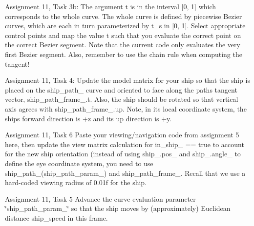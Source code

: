 \begin{DoxyRefList}
\item[\label{todo__todo000005}%
\hypertarget{todo__todo000005}{}%
Member \hyperlink{classPiecewiseBezier_a46e8a8d04d7fdd22b662204419c21273}{Piecewise\+Bezier\+:\+:tangent} (float t) const ]Assignment 11, Task 3b\+: The argument t is in the interval \mbox{[}0, 1\mbox{]} which corresponds to the whole curve. The whole curve is defined by piecewise Bezier curves, which are each in turn parameterized by t\+\_\+s in \mbox{[}0, 1\mbox{]}. Select appropriate control points and map the value t such that you evaluate the correct point on the correct Bezier segment. Note that the current code only evaluates the very first Bezier segment. Also, remember to use the chain rule when computing the tangent!  
\item[\label{todo__todo000008}%
\hypertarget{todo__todo000008}{}%
Member \hyperlink{classSolar__viewer_af6b468fb543b9c9ed466fe1687f1aff8}{Solar\+\_\+viewer\+:\+:draw\+\_\+scene} (\hyperlink{classmat4}{mat4} \&\+\_\+projection, \hyperlink{classmat4}{mat4} \&\+\_\+view)]Assignment 11, Task 4\+: Update the model matrix for your ship so that the ship is placed on the {\ttfamily ship\+\_\+path\+\_\+} curve and oriented to face along the path\textquotesingle{}s tangent vector, {\ttfamily ship\+\_\+path\+\_\+frame\+\_\+.\+t}. Also, the ship should be rotated so that vertical axis agrees with {\ttfamily ship\+\_\+path\+\_\+frame\+\_\+.\+up}. Note, in its local coordinate system, the ship\textquotesingle{}s forward direction is +z and its up direction is +y.  
\item[\label{todo__todo000007}%
\hypertarget{todo__todo000007}{}%
Member \hyperlink{classSolar__viewer_ab0c48ceb8d58aefee8c5528c9efa6412}{Solar\+\_\+viewer\+:\+:paint} ()]Assignment 11, Task 6 Paste your viewing/navigation code from assignment 5 here, then update the view matrix calculation for in\+\_\+ship\+\_\+ == true to account for the new ship orientation (instead of using {\ttfamily ship\+\_\+.\+pos\+\_\+} and {\ttfamily ship\+\_\+.\+angle\+\_\+} to define the eye coordinate system, you need to use {\ttfamily ship\+\_\+path\+\_\+(ship\+\_\+path\+\_\+param\+\_\+)} and {\ttfamily ship\+\_\+path\+\_\+frame\+\_\+}. Recall that we use a hard-\/coded viewing radius of 0.\+01f for the ship.  
\item[\label{todo__todo000006}%
\hypertarget{todo__todo000006}{}%
Member \hyperlink{classSolar__viewer_a1b9915ee3f62232328c7326753c11101}{Solar\+\_\+viewer\+:\+:timer} ()]Assignment 11, Task 5 Advance the curve evaluation parameter \char`\"{}ship\+\_\+path\+\_\+param\+\_\+\char`\"{} so that the ship moves by (approximately) Euclidean distance {\ttfamily ship\+\_\+speed} in this frame. 
\end{DoxyRefList}